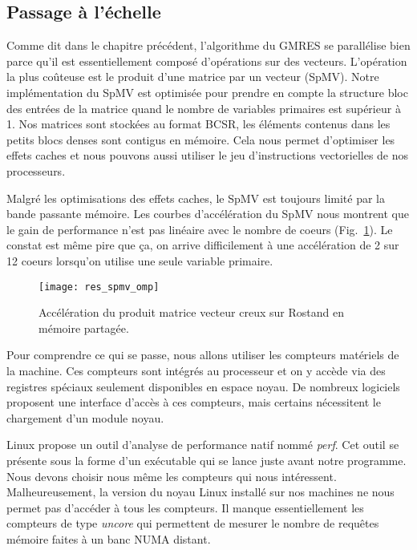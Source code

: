 \subsection{Passage à l'échelle}
\label{sec:compteur}
Comme dit dans le chapitre précédent, l'algorithme du GMRES se parallélise bien parce qu'il est essentiellement composé d'opérations sur des vecteurs.
%
L'opération la plus coûteuse est le produit d'une matrice par un vecteur (SpMV).
%
Notre implémentation du SpMV est optimisée pour prendre en compte la structure bloc des entrées de la matrice quand le nombre de variables primaires est supérieur à 1.
%
Nos matrices sont stockées au format BCSR, les éléments contenus dans les petits blocs denses sont contigus en mémoire.
%
Cela nous permet d'optimiser les effets caches et nous pouvons aussi utiliser le jeu d'instructions vectorielles de nos processeurs.

Malgré les optimisations des effets caches, le SpMV est toujours limité par la bande passante mémoire.
%
Les courbes d'accélération du SpMV nous montrent que le gain de performance n'est pas linéaire avec le nombre de coeurs (Fig.~\ref{fig:res_spmv_omp_rostand}).
%
Le constat est même pire que ça, on arrive difficilement à une accélération de 2 sur 12 coeurs lorsqu'on utilise une seule variable primaire.
\begin{figure}[!h]
  \centering
  \texttt{[image: res\_spmv\_omp]}
  \caption{Accélération du produit matrice vecteur creux sur Rostand en mémoire partagée.}
  \label{fig:res_spmv_omp_rostand}
\end{figure}

Pour comprendre ce qui se passe, nous allons utiliser les compteurs matériels de la machine.
%
Ces compteurs sont intégrés au processeur et on y accède via des registres spéciaux seulement disponibles en espace noyau.
%
De nombreux logiciels proposent une interface d'accès à ces compteurs, mais certains nécessitent le chargement d'un module noyau.


Linux propose un outil d'analyse de performance natif nommé {\em perf}.
%
Cet outil se présente sous la forme d'un exécutable qui se lance juste avant notre programme.
%
Nous devons choisir nous même les compteurs qui nous intéressent.
%
Malheureusement, la version du noyau Linux installé sur nos machines ne nous permet pas d'accéder à tous les compteurs.
%
Il manque essentiellement les compteurs de type {\em uncore} qui permettent de mesurer le nombre de requêtes mémoire faites à un banc NUMA distant.




